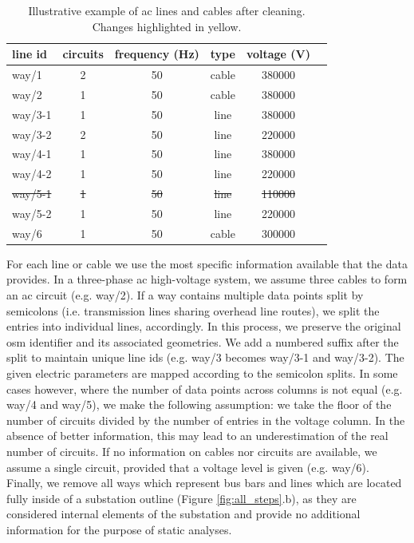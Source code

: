 \documentclass[fleqn,10pt]{wlscirep}
\let\autocite\cite
\begin{document}
\begin{table}[!htbp]
    \centering
    \begin{tabular}{|l|c|c|c|c|c|}
    \hline
    \textbf{line id} & \textbf{circuits} & \textbf{frequency (Hz)} & \textbf{type} & \textbf{voltage (V)} \\
    \hline
    way/1 & 2 & 50 & cable & \SI{380000}{} \\
    \hline
    way/2 & \cellcolor{yellow!50}1 & 50 & cable & \SI{380000}{} \\
    \hline
    way/3-1 & \cellcolor{yellow!50}1 & 50 & line & \cellcolor{yellow!50}\SI{380000}{} \\
    \hline
    way/3-2 & \cellcolor{yellow!50}2 & 50 & line & \cellcolor{yellow!50}\SI{220000}{} \\
    \hline
    way/4-1 & \cellcolor{yellow!50}1 & \cellcolor{yellow!50}50 & line & \cellcolor{yellow!50}\SI{380000}{} \\
    \hline
    way/4-2 & \cellcolor{yellow!50}1 & \cellcolor{yellow!50}50 & line & \cellcolor{yellow!50}\SI{220000}{} \\
    \hline
    \sout{way/5-1} & \cellcolor{yellow!50}\sout{1} & \sout{50} & \sout{line} & \cellcolor{yellow!50}\sout{\SI{110000}{}} \\
    \hline
    way/5-2 & \cellcolor{yellow!50}1 & 50 & line & \cellcolor{yellow!50}\SI{220000}{} \\
    \hline
    way/6 & \cellcolor{yellow!50}1 & 50 & cable & \SI{300000}{}\\
    \hline
    \end{tabular}
    \caption{Illustrative example of \acrshort{ac} lines and cables after cleaning. Changes highlighted in yellow.}
    \label{tab:aclines_example2} 
\end{table}

For each line or cable we use the most specific information available that the data provides. In a three-phase \acrshort{ac} high-voltage system, we assume three cables to form an \acrshort{ac} circuit (e.g. way/2).\autocite{kirschenPowerSystemsFundamental2024} If a way contains multiple data points split by semicolons (i.e. transmission lines sharing overhead line routes), we split the entries into individual lines, accordingly. In this process, we preserve the original \gls{osm} identifier and its associated geometries. We add a numbered suffix after the split to maintain unique line ids (e.g. way/3 becomes way/3-1 and way/3-2). The given electric parameters are mapped according to the semicolon splits. In some cases however, where the number of data points across columns is not equal (e.g. way/4 and way/5), we make the following assumption: we take the floor of the number of circuits divided by the number of entries in the voltage column. In the absence of better information, this may lead to an underestimation of the real number of circuits. If no information on cables nor circuits are available, we assume a single circuit, provided that a voltage level is given (e.g. way/6). Finally, we remove all ways which represent bus bars and lines which are located fully inside of a substation outline (Figure \ref{fig:all_steps}.b), as they are considered internal elements of the substation and provide no additional information for the purpose of static analyses.
\end{document}
